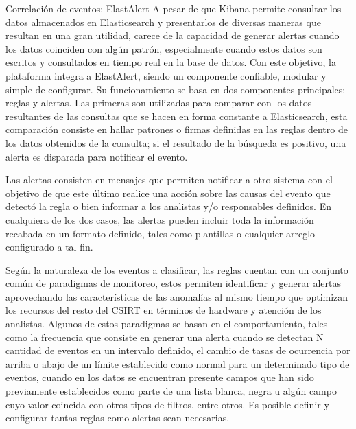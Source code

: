    \begin{section}{Correlación de eventos: ElastAlert}
   \label{seccion4-5}
     A pesar de que Kibana permite consultar los datos almacenados en Elasticsearch y presentarlos de diversas maneras que resultan en una gran utilidad, carece de la capacidad de generar alertas cuando los datos coinciden con algún patrón, especialmente cuando estos datos son escritos y consultados en tiempo real en la base de datos. Con este objetivo, la plataforma integra a ElastAlert, siendo un componente confiable, modular y simple de configurar. Su funcionamiento se basa en dos componentes principales: reglas y alertas. Las primeras son utilizadas para comparar con los datos resultantes de las consultas que se hacen en forma constante a Elasticsearch, esta comparación consiste en hallar patrones o firmas definidas en las reglas dentro de los datos obtenidos de la consulta; si el resultado de la búsqueda es positivo, una alerta es disparada para notificar el evento. \par
     Las alertas consisten en mensajes que permiten notificar a otro sistema con el objetivo de que este último realice una acción sobre las causas del evento que detectó la regla o bien informar a los analistas y/o responsables definidos. En cualquiera de los dos casos, las alertas pueden incluir toda la información recabada en un formato definido, tales como plantillas o cualquier arreglo configurado a tal fin. \par
     Según la naturaleza de los eventos a clasificar, las reglas cuentan con un conjunto común de paradigmas de monitoreo, estos permiten identificar y generar alertas aprovechando las características de las anomalías al mismo tiempo que optimizan los recursos del resto del CSIRT en términos de hardware y atención de los analistas. Algunos de estos paradigmas se basan en el comportamiento, tales como la frecuencia que consiste en generar una alerta cuando se detectan N cantidad de eventos en un intervalo definido, el cambio de tasas de ocurrencia por arriba o abajo de un límite establecido como normal para un determinado tipo de eventos, cuando en los datos se encuentran presente campos que han sido previamente establecidos como parte de una lista blanca, negra u algún campo cuyo valor coincida con otros tipos de filtros, entre otros. Es posible definir y configurar tantas reglas como alertas sean necesarias. \par

   \end{section}
   \pagebreak
